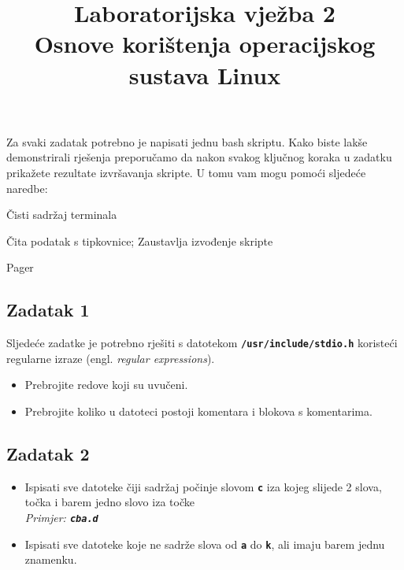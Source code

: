 \documentclass[12pt,a4paper]{article}
\newcommand{\shell}[1]{\texttt{\textbf{#1}}}
\begin{document}
	\title{Laboratorijska vježba 2\\{\small Osnove korištenja operacijskog sustava Linux}\vspace{-2em}}
	\maketitle
	Za svaki zadatak potrebno je napisati jednu bash skriptu. Kako biste lakše demonstrirali rješenja preporučamo da nakon svakog ključnog koraka u zadatku prikažete rezultate izvršavanja skripte. U tomu vam mogu pomoći sljedeće naredbe:
	\begin{description}[leftmargin=!,labelwidth=4em,itemsep=0em]
		\item[\shell{clear}] Čisti sadržaj terminala
		\item[\shell{read -p}] Čita podatak s tipkovnice; Zaustavlja izvođenje skripte
		\item[\shell{less}] Pager
	\end{description}

	\subsection*{Zadatak 1}
	Sljedeće zadatke je potrebno rješiti s datotekom \shell{/usr/include/stdio.h} koristeći regularne izraze (engl. \textit{regular expressions}).
	\begin{itemize}
		\item Prebrojite redove koji su uvučeni.
		\item Prebrojite koliko u datoteci postoji komentara i blokova s komentarima.
	\end{itemize}

	\subsection*{Zadatak 2}
	\begin{itemize}
		\item Ispisati sve datoteke čiji sadržaj počinje slovom \shell{c} iza kojeg slijede 2 slova, točka i barem jedno slovo iza točke \\ \textit{Primjer: \shell{cba.d} }
		\item Ispisati sve datoteke koje ne sadrže slova od \shell{a} do \shell{k}, ali imaju barem jednu znamenku.
	\end{itemize}
\end{document}
